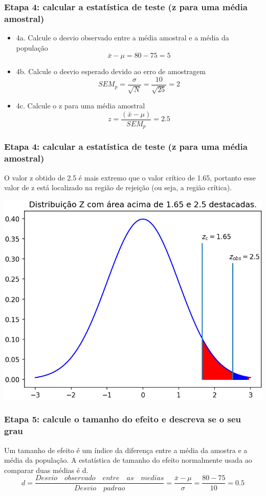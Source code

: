 \documentclass[11pt]{beamer}
\begin{document}
\begin{frame}
\frametitle{Etapa 4: calcular a estatística de teste (z para uma média amostral)}
\begin{itemize}
\item 4a. Calcule o desvio observado entre a média amostral e a média da população
\[\bar{x} - \mu = 80 - 75 = 5\]
\item 4b. Calcule o desvio esperado devido ao erro de amostragem
\[SEM_p = \frac{\sigma}{\sqrt{N}} = \frac{10}{\sqrt{25}} = 2\]
\item 4c. Calcule o z para uma média amostral
\[z = \frac{(\bar{x} - \mu)}{SEM_p} = 2.5\]
\end{itemize}
\end{frame}

\begin{frame}
\frametitle{Etapa 4: calcular a estatística de teste (z para uma média amostral)}
O valor z obtido de 2.5 é mais extremo que o valor crítico de 1.65, portanto esse valor de z está localizado na região de rejeição (ou seja, a região crítica).
\begin{center}\includegraphics[width=0.55\linewidth]{figs/regiao_critica_observada} \end{center}

\end{frame}


\begin{frame}
\frametitle{Etapa 5: calcule o tamanho do efeito e descreva se o seu grau}
Um tamanho de efeito é um índice da diferença entre a média da amostra e a média da população. A estatística de tamanho do efeito normalmente usada ao comparar duas médias é d. 
\[d = \frac{Desvio\quad observado\quad entre\quad as\quad medias}{Desvio\quad padrao} = \frac{\bar{x}-\mu}{\sigma} = \frac{80-75}{10} = 0.5\]

\end{frame}
\end{document}
